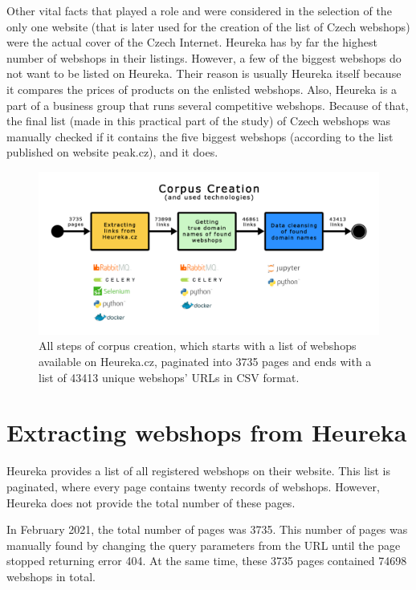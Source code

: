 Other vital facts that played a role and were considered in the selection of the only one website (that is later used for the creation of the list of Czech webshops) were the actual cover of the Czech Internet. Heureka has by far the highest number of webshops in their listings\cite{srovnavace-shoptet}. However, a few of the biggest webshops do not want to be listed on Heureka. Their reason is usually Heureka itself because it compares the prices of products on the enlisted webshops. Also, Heureka is a part of a business group that runs several competitive webshops. Because of that, the final list (made in this practical part of the study) of Czech webshops was manually checked if it contains the five biggest webshops (according to the list published on website peak.cz\cite{peak-eshopy}), and it does.

\begin{figure}[ht]
    \centering
    \includegraphics[width=1\linewidth]{media/corpus_creation.png}
    \caption{All steps of corpus creation, which starts with a list of webshops available on Heureka.cz, paginated into 3735 pages and ends with a list of 43413 unique webshops' URLs in CSV format.}
    \label{fig:corpus_creation}
\end{figure}

\section{Extracting webshops from Heureka}

Heureka provides a list of all registered webshops on their website. This list is paginated, where every page contains twenty records of webshops. However, Heureka does not provide the total number of these pages. 

In February 2021, the total number of pages was 3735. This number of pages was manually found by changing the query parameters from the URL until the page stopped returning error 404. At the same time, these 3735 pages contained 74698 webshops in total. 

